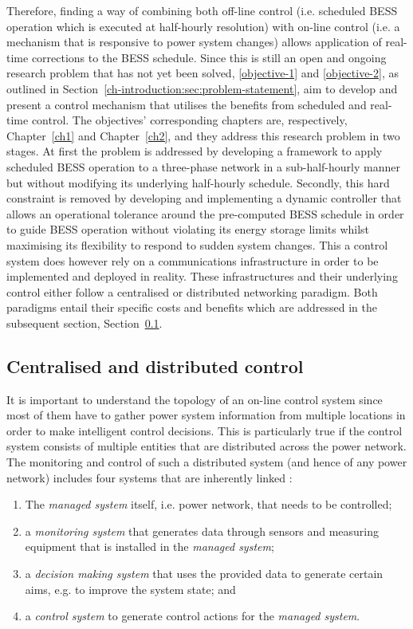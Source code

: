 Therefore, finding a way of combining both off-line control (i.e. scheduled BESS operation which is executed at half-hourly resolution) with on-line control (i.e. a mechanism that is responsive to power system changes) allows application of real-time corrections to the BESS schedule.
Since this is still an open and ongoing research problem that has not yet been solved, \ref{objective-1} and \ref{objective-2}, as outlined in Section~\ref{ch-introduction:sec:problem-statement}, aim to develop and present a control mechanism that utilises the benefits from scheduled and real-time control.
The objectives' corresponding chapters are, respectively, Chapter~\ref{ch1} and Chapter~\ref{ch2}, and they address this research problem in two stages.
At first the problem is addressed by developing a framework to apply scheduled BESS operation to a three-phase network in a sub-half-hourly manner but without modifying its underlying half-hourly schedule.
Secondly, this hard constraint is removed by developing and implementing a dynamic controller that allows an operational tolerance around the pre-computed BESS schedule in order to guide BESS operation without violating its energy storage limits whilst maximising its flexibility to respond to sudden system changes.
This a control system does however rely on a communications infrastructure in order to be implemented and deployed in reality.
These infrastructures and their underlying control either follow a centralised or distributed networking paradigm.
Both paradigms entail their specific costs and benefits which are addressed in the subsequent section, Section~\ref{ch-literature:subsec:centralised-and-distributed-control}.

\subsection{Centralised and distributed control}
\label{ch-literature:subsec:centralised-and-distributed-control}

It is important to understand the topology of an on-line control system since most of them have to gather power system information from multiple locations in order to make intelligent control decisions.
This is particularly true if the control system consists of multiple entities that are distributed across the power network.
The monitoring and control of such a distributed system (and hence of any power network) includes four systems that are inherently linked \cite{Mansouri-Samani1993}:

\begin{enumerate}
	\item The \textit{managed system} itself, i.e. power network, that needs to be controlled;
	\item a \textit{monitoring system} that generates data through sensors and measuring equipment that is installed in the \textit{managed system};
	\item a \textit{decision making system} that uses the provided data to generate certain aims, e.g. to improve the system state; and
	\item a \textit{control system} to generate control actions for the \textit{managed system}.
\end{enumerate}

